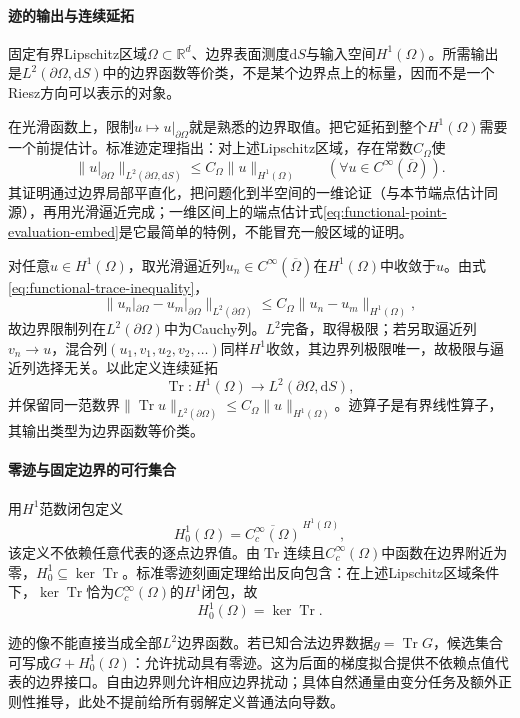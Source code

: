 \paragraph{迹的输出与连续延拓}

固定有界Lipschitz区域$\Omega\subset\mathbb R^d$、边界表面测度$\mathrm dS$与输入空间$H^1(\Omega)$。所需输出是$L^2(\partial\Omega,\mathrm dS)$中的边界函数等价类，不是某个边界点上的标量，因而不是一个Riesz方向可以表示的对象。

在光滑函数上，限制$u\mapsto u|_{\partial\Omega}$就是熟悉的边界取值。把它延拓到整个$H^1(\Omega)$需要一个前提估计。标准迹定理指出：对上述Lipschitz区域，存在常数$C_\Omega$使
\begin{equation}
\label{eq:functional-trace-inequality}
\|u|_{\partial\Omega}\|_{L^2(\partial\Omega,\mathrm dS)}
\le C_\Omega\|u\|_{H^1(\Omega)}
\qquad(\forall u\in C^\infty(\overline\Omega)).
\end{equation}
其证明通过边界局部平直化，把问题化到半空间的一维论证（与本节端点估计同源），再用光滑逼近完成；一维区间上的端点估计式\eqref{eq:functional-point-evaluation-embed}是它最简单的特例，不能冒充一般区域的证明。

对任意$u\in H^1(\Omega)$，取光滑逼近列$u_n\in C^\infty(\overline\Omega)$在$H^1(\Omega)$中收敛于$u$。由式\eqref{eq:functional-trace-inequality}，
\[
\|u_n|_{\partial\Omega}-u_m|_{\partial\Omega}\|_{L^2(\partial\Omega)}
\le C_\Omega\|u_n-u_m\|_{H^1(\Omega)},
\]
故边界限制列在$L^2(\partial\Omega)$中为Cauchy列。$L^2$完备，取得极限；若另取逼近列$v_n\to u$，混合列$(u_1,v_1,u_2,v_2,\dots)$同样$H^1$收敛，其边界列极限唯一，故极限与逼近列选择无关。以此定义连续延拓
\[
\operatorname{Tr}:H^1(\Omega)\to L^2(\partial\Omega,\mathrm dS),
\]
并保留同一范数界$\|\operatorname{Tr}u\|_{L^2(\partial\Omega)}\le C_\Omega\|u\|_{H^1(\Omega)}$。迹算子是有界线性算子，其输出类型为边界函数等价类。

\paragraph{零迹与固定边界的可行集合}

用$H^1$范数闭包定义
\[
H_0^1(\Omega)=\overline{C_c^\infty(\Omega)}^{\,H^1(\Omega)},
\]
该定义不依赖任意代表的逐点边界值。由$\operatorname{Tr}$连续且$C_c^\infty(\Omega)$中函数在边界附近为零，$H_0^1\subseteq\ker\operatorname{Tr}$。标准零迹刻画定理给出反向包含：在上述Lipschitz区域条件下，$\ker\operatorname{Tr}$恰为$C_c^\infty(\Omega)$的$H^1$闭包，故
\[
H_0^1(\Omega)=\ker\operatorname{Tr}.
\]

迹的像不能直接当成全部$L^2$边界函数。若已知合法边界数据$g=\operatorname{Tr}G$，候选集合可写成$G+H_0^1(\Omega)$：允许扰动具有零迹。这为后面的梯度拟合提供不依赖点值代表的边界接口。自由边界则允许相应边界扰动；具体自然通量由变分任务及额外正则性推导，此处不提前给所有弱解定义普通法向导数。

